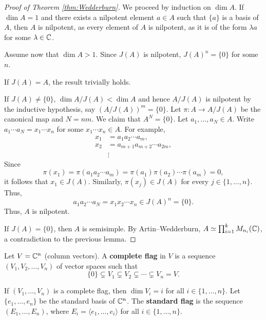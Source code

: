 \begin{proof}[Proof of Theorem \ref{thm:Wedderburn}]
    We proceed by induction on $\dim A$. If $\dim A=1$ and 
    there exists a nilpotent element $a\in A$ such that 
    $\{a\}$ is a basis of $A$, then $A$ is nilpotent, 
    as every element of $A$ is nilpotent, as it is 
    of the form 
    $\lambda a$ for some $\lambda\in\mathbb{C}$. 
    
    Assume now that $\dim A>1$. Since $J(A)$ is nilpotent, $J(A)^n=\{0\}$ 
    for some $n$. 
    
    If $J(A)=A$, the result trivially holds. 
    
    If $J(A)\ne\{0\}$, 
    $\dim A/J(A)<\dim A$ and hence 
    $A/J(A)$ is nilpotent by 
    the inductive hypothesis, 
    say $(A/J(A))^m=\{0\}$. Let $\pi\colon A\to A/J(A)$ be the canonical map and 
    $N=nm$. We claim that $A^N=\{0\}$. Let $a_1,\dots,a_N\in A$. Write
    $a_1\cdots a_N=x_1\cdots x_n$ for some $x_1\cdots x_n\in A$. For example,
    \begin{align*}
    x_1&=a_1a_2\cdots a_m,\\
    x_2&=a_{m+1}a_{m+2}\cdots a_{2m},\\
    &\vdots
    \end{align*}
    Since 
    \[
    \pi(x_1)=\pi(a_1a_2\cdots a_m)=\pi(a_1)\pi(a_2)\cdots\pi(a_m)=0,
    \]
    it follows that $x_1\in J(A)$. Similarly, 
    $\pi(x_j)\in J(A)$
    for every $j\in\{1,\dots,n\}$. Thus,
    \[
    a_1a_2\cdots a_N=x_1x_2\cdots x_n\in J(A)^n=\{0\}. 
    \]
    Thus, $A$ is nilpotent. 
    
    If $J(A)=\{0\}$, then 
    $A$ is semisimple. By Artin--Wedderburn, 
    $A\simeq\prod_{i=1}^k M_{n_i}(\mathbb{C})$, a contradiction to 
    the previous lemma. 
\end{proof}

\begin{definition}
    Let $V=\mathbb{C}^{n}$ (column vectors). A \textbf{complete flag} in $V$ 
    is a sequence $(V_1,V_2,\dots,V_n)$ of vector spaces
    such that 
    \[
    \{0\}\subsetneq V_1\subsetneq V_2\subsetneq\cdots\subsetneq V_n=V.
    \]
\end{definition}

If $(V_1,\dots,V_n)$ is a complete flag, then $\dim V_i=i$ for all 
$i\in\{1,\dots,n\}$. 
Let $\{e_1,\dots,e_n\}$ be the standard basis of $\mathbb{C}^n$. 
The \textbf{standard flag} is the sequence $(E_1,\dots,E_n)$, where
$E_i=\langle e_1,\dots,e_i\rangle$ for all $i\in\{1,\dots,n\}$.  

